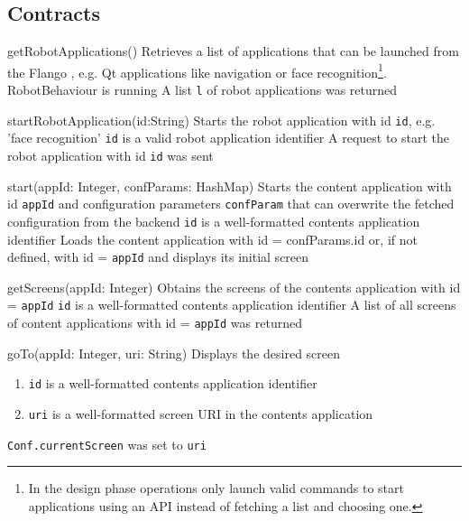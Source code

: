 \FloatBarrier
\subsection{Contracts}
\begin{sopcontract}{getRobotApplications()}
{Retrieves a list of applications that can be launched from the Flango \cm , e.g. Qt applications like navigation or face recognition\footnote{In the design phase operations only launch valid commands to start applications using an \ac{API} instead of fetching a list and choosing one.}.}
{RobotBehaviour is running}
{A list \texttt{l} of robot applications was returned}
\end{sopcontract}

\begin{sopcontract}{startRobotApplication(id:String)}
{Starts the robot application with id \texttt{id}, e.g. 'face recognition'}
{\texttt{id} is a valid robot application identifier}
{A request to start the robot application with id \texttt{id} was sent}
\end{sopcontract}

\begin{sopcontract}{start(appId: Integer, confParams: HashMap)}
{Starts the content application with id \texttt{appId} and configuration parameters \texttt{confParam} that can overwrite the fetched configuration from the backend}
{\texttt{id} is a well-formatted contents application identifier}
{Loads the content application with id = confParams.id or, if not defined, with id = \texttt{appId} and displays its initial screen}
\end{sopcontract}

\begin{sopcontract}{getScreens(appId: Integer)}
{Obtains the screens of the contents application with id = \texttt{appId}}
{\texttt{id} is a well-formatted contents application identifier}
{A list of all screens of content applications with id = \texttt{appId} was returned}
\end{sopcontract}

\begin{sopcontract}{goTo(appId: Integer, uri: String)}
{Displays the desired screen}
{
\begin{enumerate}
    \item \texttt{id} is a well-formatted contents application identifier 
    \item \texttt{uri} is a well-formatted screen \ac{URI} in the contents application
\end{enumerate}
}
{\texttt{Conf.currentScreen} was set to \texttt{uri}}
\end{sopcontract}

